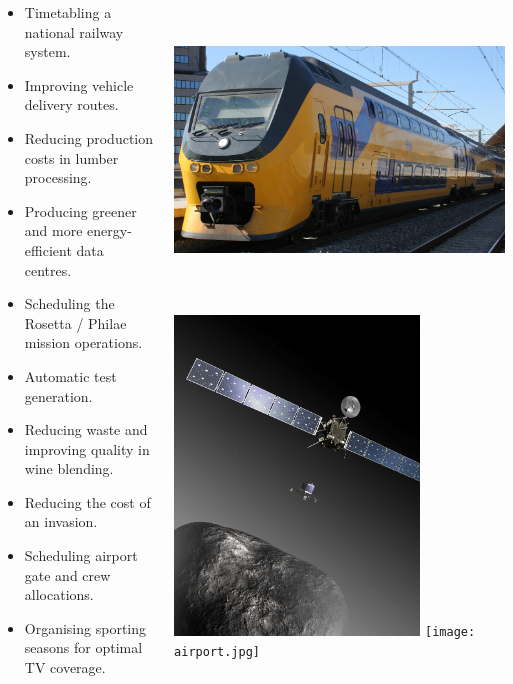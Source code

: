 \documentclass[a0paper]{tikzposter}
\begin{document}
\begin{columns}
{\begin{itemize}
    \item Timetabling a national railway system.
    \item Improving vehicle delivery routes.
    \item Reducing production costs in lumber processing.
    \item Producing greener and more energy-efficient data centres.
    \item Scheduling the Rosetta / Philae mission operations.
    \item Automatic test generation.
    \item Reducing waste and improving quality in wine blending.
    \item Reducing the cost of an invasion.
    \item Scheduling airport gate and crew allocations.
    \item Organising sporting seasons for optimal TV coverage.
\end{itemize}

\vspace{1em}

\begin{center}
    \includegraphics*[keepaspectratio=true,height=8.5cm]{train.jpg}
    \hfill
    \includegraphics*[keepaspectratio=true,height=8.5cm]{comet.jpg}
    \hfill
    \texttt{[image: airport.jpg]}
\end{center}

}
\end{columns}
\end{document}
